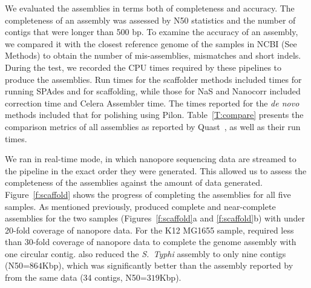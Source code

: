 We evaluated the assemblies in terms both of completeness and accuracy.
The completeness of an assembly was assessed by N50 statistics and the
number of contigs that were longer than 500 bp. To examine the accuracy of an
assembly, we compared it with the closest reference genome of the samples in
NCBI (See Methods) to obtain the number of mis-assemblies, mismatches and
short indels.
During the test, we recorded the CPU times
required by these pipelines to produce the assemblies. Run times for
the scaffolder methods included times for running SPAdes and for scaffolding,
while those for NaS and Nanocorr included correction time and Celera
Assembler time.
The times reported for the \emph{de novo} methods included that for
polishing using Pilon.
Table~\ref{T:compare} presents the comparison metrics of all assemblies as 
reported by Quast~\cite{GurevichSV2013}, as well as their run times. 
 
We ran \npscarf{} in real-time mode, in which nanopore sequencing data are
streamed to the pipeline in the exact order they were generated.
This allowed us to assess the completeness of the assemblies against the 
amount of data generated.
Figure~\ref{f:scaffold} shows the progress of completing the assemblies
for all five samples. As mentioned previously, \npscarf{} produced complete and
near-complete assemblies for the two \kp{} samples (Figures~\ref{f:scaffold}a
and \ref{f:scaffold}b) with under 20-fold coverage of nanopore data.
For the \ec{} K12 MG1655 sample, \npscarf{} required less than 30-fold coverage of 
nanopore data to complete the genome assembly with one circular contig.
\npscarf{} also reduced the \emph{S.~Typhi} assembly to only nine contigs (N50=$864$Kbp),
which was significantly better than the assembly reported by~\cite{AshtonND2015} 
from the same data (34 contigs, N50=$319$Kbp).

